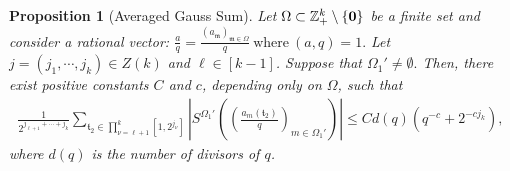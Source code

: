 \documentclass[10pt,a4paper]{amsart}
\newtheorem{proposition}{Proposition}\numberwithin{proposition}{section}
\numberwithin{equation}{section}
\begin{document}
\begin{proposition}[Averaged  Gauss Sum]\label{lem22p}
Let $\Omega\subset \mathbb{Z}_+^k \setminus \{{\bf 0}\}$ be a finite set and consider a rational vector: 
$
\frac{a}{q}=\frac{(a_{\mathfrak{m}})_{\mathfrak{m}\in \Omega}}{q}  \ \text{where}  \ (a,q)=1.$ 
Let $j=(j_1,\cdots,j_k) \in Z(k) $ and $\ell\in[k-1]$. Suppose that $\Omega_{1}'\neq \emptyset.$ Then, there exist positive constants $C$ and $c$, depending only on $\Omega$, such that
\begin{align}\label{po10}
 \frac{1}{ 2^{j_{\ell+1} +\cdots+ j_k}       } \sum_{\mathfrak{t}_2\in \prod_{\nu=\ell+1}^k [1,2^{j_\nu}] }  \left|S^{\Omega_{1}'}\left(\left( \frac{a_{m}(\mathfrak{t}_2)}{q} \right)_{m\in \Omega_{1}'}\right) \right|\le C d(q) \left(q^{-c}+2^{-cj_{k}}\right),
\end{align} 
where $d(q)$ is the number of divisors of $q$. 

 \end{proposition} 
 
 
 

 
 
\end{document}
